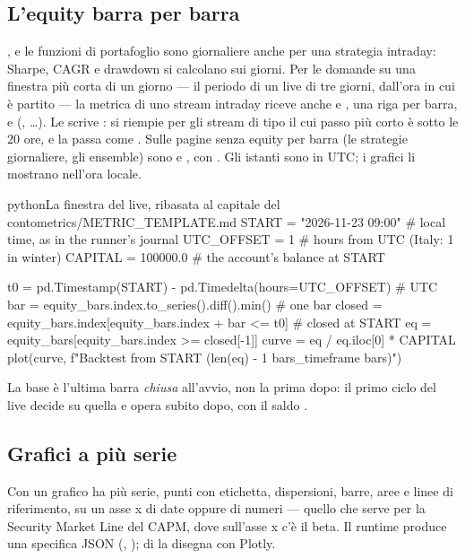 \subsection{L'equity barra per barra}\label{sez:metrica-barre}

,  e le funzioni di portafoglio sono giornaliere
anche per una strategia intraday: Sharpe, CAGR e drawdown si calcolano sui
giorni. Per le domande su una finestra più corta di un giorno --- il periodo
di un live di tre giorni, dall'ora in cui è partito --- la metrica di uno
stream intraday riceve anche  e , una
riga per barra, e  (, \ldots).
Le scrive :  si riempie per
gli stream di tipo  il cui passo più corto è sotto le
\num{20} ore, e  la passa come .
Sulle pagine senza equity per barra (le strategie giornaliere, gli ensemble)
sono  e , con . Gli
istanti sono in UTC; i grafici li mostrano nell'ora locale.

\begin{codiceInterno}{python}{La finestra del live, ribasata al capitale del conto}{metrics/METRIC\_TEMPLATE.md}
START = "2026-11-23 09:00"      # local time, as in the runner's journal
UTC_OFFSET = 1                  # hours from UTC (Italy: 1 in winter)
CAPITAL = 100000.0              # the account's balance at START

t0 = pd.Timestamp(START) - pd.Timedelta(hours=UTC_OFFSET)       # UTC
bar = equity_bars.index.to_series().diff().min()                # one bar
closed = equity_bars.index[equity_bars.index + bar <= t0]       # closed at START
eq = equity_bars[equity_bars.index >= closed[-1]]
curve = eq / eq.iloc[0] * CAPITAL
plot(curve, f"Backtest from {START} ({len(eq) - 1} {bars_timeframe} bars)")
\end{codiceInterno}

\noindent
La base è l'ultima barra \emph{chiusa} all'avvio, non la prima dopo: il primo
ciclo del live decide su quella e opera subito dopo, con il saldo
.

\subsection{Grafici a più serie}

Con  un grafico ha più serie, punti con
etichetta, dispersioni, barre, aree e linee di riferimento, su un asse x di
date oppure di numeri --- quello che serve per la Security Market Line del
CAPM, dove sull'asse x c'è il beta. Il runtime produce una specifica JSON
(, );  di
 la disegna con Plotly.

